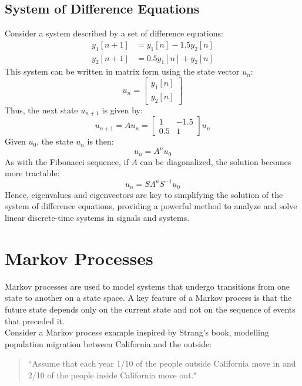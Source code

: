 \subsection*{System of Difference Equations}

Consider a system described by a set of difference equations:
\begin{align}
    y_1[n+1] &= y_1[n] - 1.5y_2[n] \\
    y_2[n+1] &= 0.5y_1[n] + y_2[n]
\end{align}
This system can be written in matrix form using the state vector $u_n$:
\begin{equation}
    u_n = \begin{bmatrix}
    y_1[n] \\
    y_2[n]
    \end{bmatrix}
\end{equation}
Thus, the next state $u_{n+1}$ is given by:
\begin{equation}
    u_{n+1} = A u_n = \begin{bmatrix}
    1 & -1.5 \\
    0.5 & 1
    \end{bmatrix} u_n
\end{equation}
Given $u_0$, the state $u_n$ is then:
\begin{equation}
    u_n = A^n u_0
\end{equation}
As with the Fibonacci sequence, if $A$ can be diagonalized, the solution becomes more tractable:
\begin{equation}
    u_n = S \Lambda^n S^{-1} u_0
\end{equation}
Hence, eigenvalues and eigenvectors are key to simplifying the solution of the system of difference equations, providing a powerful method to analyze and solve linear discrete-time systems in signals and systems.\\

\section{Markov Processes}
Markov processes are used to model systems that undergo transitions from one state to another on a state space. A key feature of a Markov process is that the future state depends only on the current state and not on the sequence of events that preceded it.\\


Consider a Markov process example inspired by Strang's book, modelling population migration between California and the outside:
\begin{quote}
    ``Assume that each year 1/10 of the people outside California move in and 2/10 of the people inside California move out."
\end{quote}

